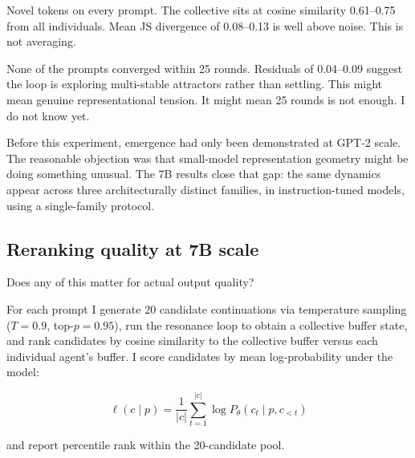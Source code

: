 \documentclass[10pt,twocolumn]{article}
\begin{document}
Novel tokens on every prompt. The collective sits at cosine similarity 0.61--0.75 from all individuals. Mean JS divergence of 0.08--0.13 is well above noise. This is not averaging.

None of the prompts converged within 25 rounds. Residuals of 0.04--0.09 suggest the loop is exploring multi-stable attractors rather than settling. This might mean genuine representational tension. It might mean 25 rounds is not enough. I do not know yet.

Before this experiment, emergence had only been demonstrated at GPT-2 scale. The reasonable objection was that small-model representation geometry might be doing something unusual. The 7B results close that gap: the same dynamics appear across three architecturally distinct families, in instruction-tuned models, using a single-family protocol.

\subsection{Reranking quality at 7B scale}
\label{sec:reranking}

Does any of this matter for actual output quality?

For each prompt I generate 20 candidate continuations via temperature sampling ($T = 0.9$, top-$p = 0.95$), run the resonance loop to obtain a collective buffer state, and rank candidates by cosine similarity to the collective buffer versus each individual agent's buffer. I score candidates by mean log-probability under the model:

\begin{equation}
    \ell(c \mid p) = \frac{1}{|c|} \sum_{t=1}^{|c|} \log P_\theta(c_t \mid p, c_{<t})
    \label{eq:logprob}
\end{equation}

and report percentile rank within the 20-candidate pool.
\end{document}
